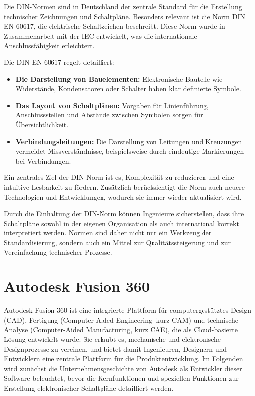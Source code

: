 Die DIN-Normen sind in Deutschland der zentrale Standard für die Erstellung technischer Zeichnungen und Schaltpläne. Besonders relevant ist die Norm DIN EN 60617, die elektrische Schaltzeichen beschreibt. Diese Norm wurde in Zusammenarbeit mit der IEC entwickelt, was die internationale Anschlussfähigkeit erleichtert.

Die DIN EN 60617 regelt detailliert:
\begin{itemize}
	\item \textbf{Die Darstellung von Bauelementen:} Elektronische Bauteile wie Widerstände, Kondensatoren oder Schalter haben klar definierte Symbole.
	\item \textbf{Das Layout von Schaltplänen:} Vorgaben für Linienführung, Anschlussstellen und Abstände zwischen Symbolen sorgen für Übersichtlichkeit.
	\item \textbf{Verbindungsleitungen:} Die Darstellung von Leitungen und Kreuzungen vermeidet Missverständnisse, beispielsweise durch eindeutige Markierungen bei Verbindungen.
\end{itemize}
Ein zentrales Ziel der DIN-Norm ist es, Komplexität zu reduzieren und eine intuitive Lesbarkeit zu fördern. Zusätzlich berücksichtigt die Norm auch neuere Technologien und Entwicklungen, wodurch sie immer wieder aktualisiert wird.

Durch die Einhaltung der DIN-Norm können Ingenieure sicherstellen, dass ihre Schaltpläne sowohl in der eigenen Organisation als auch international korrekt interpretiert werden. Normen sind daher nicht nur ein Werkzeug der Standardisierung, sondern auch ein Mittel zur Qualitätssteigerung und zur Vereinfachung technischer Prozesse.

\section{Autodesk Fusion 360}
\label{Autodesk}
Autodesk Fusion 360 ist eine integrierte Plattform für computergestütztes Design (CAD), Fertigung (Computer-Aided Engineering, kurz CAM) und technische Analyse (Computer-Aided Manufacturing, kurz CAE), die als Cloud-basierte Lösung entwickelt wurde. Sie erlaubt es, mechanische und elektronische Designprozesse zu vereinen, und bietet damit Ingenieuren, Designern und Entwicklern eine zentrale Plattform für die Produktentwicklung. Im Folgenden wird zunächst die Unternehmensgeschichte von Autodesk als Entwickler dieser Software beleuchtet, bevor die Kernfunktionen und speziellen Funktionen zur Erstellung elektronischer Schaltpläne detailliert werden.


